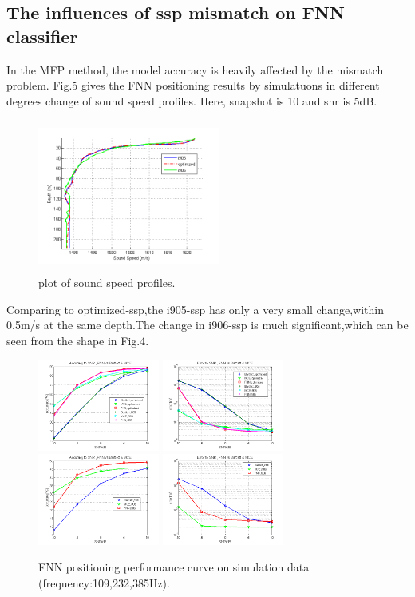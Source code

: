 \subsection{The influences of ssp mismatch on FNN classifier}
In the MFP method, the model accuracy is heavily affected by the mismatch problem. Fig.5 gives the FNN positioning results by simulatuons in different degrees change of sound speed profiles. Here, snapshot is 10 and snr is 5dB.
\begin{figure}
\includegraphics[width=6cm,height=5cm]{figure/ssp3}
\caption{plot of sound speed profiles.}
\end{figure}
Comparing to optimized-ssp,the i905-ssp has only a very small change,within 0.5m/s at the same depth.The change in i906-ssp is much significant,which can be seen from the shape in Fig.4.
\begin{figure}
\includegraphics[width=4cm,height=3cm]{figure/Accuracy_to_SNR_FNN_vs_Bartlett_MCE}
\includegraphics[width=4cm,height=3cm]{figure/Error_to_SNR_FNN_vs_Bartlett_MCE}
\includegraphics[width=4cm,height=3cm]{figure/Accuracy_to_SNR_FNN_vs_Bartlett_MCE_i906}
\includegraphics[width=4cm,height=3cm]{figure/Error_to_SNR_FNN_vs_Bartlett_MCE_i906}
\caption{FNN positioning performance curve on simulation data
(frequency:109,232,385Hz).}
\end{figure}

